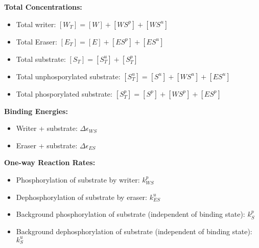 \documentclass[aps,onecolumn,superscriptaddress,notitlepage]{revtex4-1}
\begin{document}
\textbf{Total Concentrations:}
\begin{itemize}
\item Total writer: $[W_T] = [W] + [WS^p] + [WS^u]$
\item Total Eraser: $[E_T] = [E]  + [ES^p] + [ES^u]$
\item Total substrate: $[S_T] = [S^u_T] + [S^p_T]$
\item Total unphosporylated substrate: $[S^u_T] = [S^u] + [WS^u] + [ES^u]$
\item Total phosporylated substrate: $[S^p_T] = [S^p] + [WS^p] + [ES^p]$
\end{itemize}


\textbf{Binding Energies:}
\begin{itemize}
\item Writer + substrate: $\Delta\epsilon_{WS}$
\item Eraser + substrate: $\Delta\epsilon_{ES}$
\end{itemize}

\textbf{One-way Reaction Rates:}
\begin{itemize}
\item Phosphorylation of substrate by writer: $k_{WS}^p$
\item Dephosphorylation of substrate by eraser: $k_{ES}^u$
\item Background phosphorylation of substrate (independent of binding state): $k_S^p$
\item Background dephosphorylation of substrate (independent of binding state): $k_S^u$
\end{itemize}
\end{document}
